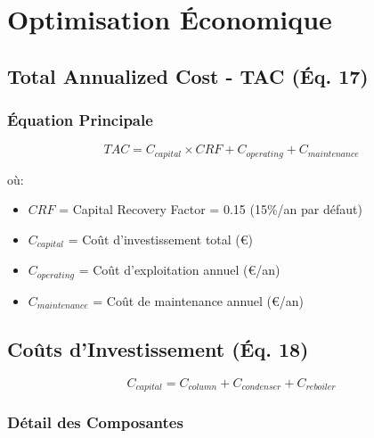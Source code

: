 \documentclass[11pt,a4paper]{article}
\begin{document}
\section{Optimisation Économique}

\subsection{Total Annualized Cost - TAC (Éq. 17)}

\subsubsection{Équation Principale}

\begin{tcolorbox}[colback=yellow!10,colframe=orange!50!black,title=Équation 17: TAC]
\begin{equation}
TAC = C_{capital} \times CRF + C_{operating} + C_{maintenance}
\end{equation}
\end{tcolorbox}

où:
\begin{itemize}[leftmargin=*]
    \item $CRF$ = Capital Recovery Factor = 0.15 (15\%/an par défaut)
    \item $C_{capital}$ = Coût d'investissement total (€)
    \item $C_{operating}$ = Coût d'exploitation annuel (€/an)
    \item $C_{maintenance}$ = Coût de maintenance annuel (€/an)
\end{itemize}

\subsection{Coûts d'Investissement (Éq. 18)}

\begin{tcolorbox}[colback=yellow!10,colframe=orange!50!black,title=Équation 18: Coût Capital]
\begin{equation}
C_{capital} = C_{column} + C_{condenser} + C_{reboiler}
\end{equation}
\end{tcolorbox}

\subsubsection{Détail des Composantes}
\end{document}
